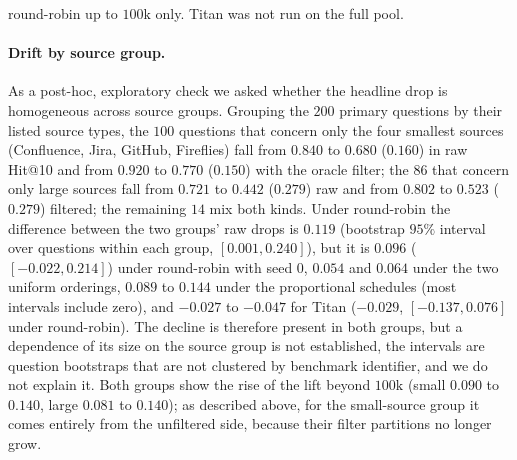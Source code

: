\documentclass{ieeeaccess}
\makeatletter
\DeclareRobustCommand{\_}{\ifmmode\nfss@text{\textunderscore}\else\textunderscore\allowbreak\fi}
\makeatother
\begin{document}
round-robin up to $100\text{k}$ only. Titan was not run on the full pool.

\paragraph{Drift by source group.} As a post-hoc, exploratory check we asked whether the headline drop is homogeneous across source groups. Grouping the $200$ primary questions by their listed source types, the $100$ questions that concern only the four smallest sources (Confluence, Jira, GitHub, Fireflies) fall from $0.840$ to $0.680$ ($0.160$) in raw Hit@10 and from $0.920$ to $0.770$ ($0.150$) with the oracle filter; the $86$ that concern only large sources fall from $0.721$ to $0.442$ ($0.279$) raw and from $0.802$ to $0.523$ ($0.279$) filtered; the remaining $14$ mix both kinds. Under round-robin the difference between the two groups' raw drops is $0.119$ (bootstrap $95\%$ interval over questions within each group, $[0.001,0.240]$), but it is $0.096$ ($[-0.022,0.214]$) under round-robin with seed $0$, $0.054$ and $0.064$ under the two uniform orderings, $0.089$ to $0.144$ under the proportional schedules (most intervals include zero), and $-0.027$ to $-0.047$ for Titan ($-0.029$, $[-0.137,0.076]$ under round-robin). The decline is therefore present in both groups, but a dependence of its size on the source group is not established, the intervals are question bootstraps that are not clustered by benchmark identifier, and we do not explain it. Both groups show the rise of the lift beyond $100\text{k}$ (small $0.090$ to $0.140$, large $0.081$ to $0.140$); as described above, for the small-source group it comes entirely from the unfiltered side, because their filter partitions no longer grow.


\end{document}
